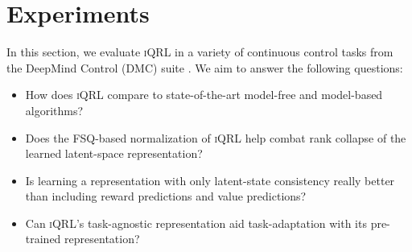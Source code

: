 \documentclass{article}
\theoremstyle{plain}
\theoremstyle{definition}
\theoremstyle{remark}
\newcommand{\our}{\textsc{iQRL}\xspace}
\begin{document}
\section{Experiments}
\label{sec:experiments}
In this section, we evaluate \our in a variety of continuous control tasks from the DeepMind Control (DMC) suite \cite{tassa2018deepmind}.
We aim to answer the following questions:
\begin{itemize}
    \item How does \our compare to state-of-the-art model-free and model-based algorithms?
    \item Does the FSQ-based normalization of \our help combat rank collapse of the learned latent-space representation?
    \item Is learning a representation with only latent-state consistency really better than including reward predictions and value predictions?
    \item Can \our's task-agnostic representation aid task-adaptation with its pre-trained representation?
\end{itemize}


\end{document}
